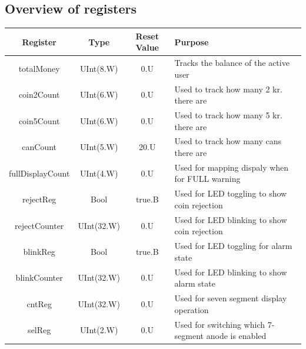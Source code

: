 \subsection{Overview of registers}
\renewcommand{\arraystretch}{1.3}
\begin{center}
    \begin{tabular}{ |c|c|c|p{7.5cm}| }
    \hline
        Register & Type & Reset Value & Purpose \\ 
        \hline \hline
        totalMoney & UInt(8.W) & 0.U & Tracks the balance of the active user \\ 
        \hline
        coin2Count & UInt(6.W) & 0.U & Used to track how many 2 kr. there are \\ 
        \hline
        coin5Count & UInt(6.W) & 0.U & Used to track how many 5 kr. there are \\ 
        \hline
        canCount & UInt(5.W) & 20.U & Used to track how many cans there are \\
        \hline
        fullDisplayCount & UInt(4.W) & 0.U & Used for mapping dispaly when for FULL warning \\
        \hline
        rejectReg & Bool & true.B & Used for LED toggling to show coin rejection \\
        \hline
        rejectCounter & UInt(32.W) & 0.U & Used for LED blinking to show coin rejection \\
        \hline
        blinkReg & Bool & true.B & Used for LED toggling for alarm state \\
        \hline
        blinkCounter & UInt(32.W) & 0.U & Used for LED blinking to show alarm state \\
        \hline
        cntReg & UInt(32.W) & 0.U & Used for seven segment display operation \\
        \hline
        selReg & UInt(2.W) & 0.U & Used for switching which 7-segment anode is enabled \\
    \hline
    \end{tabular}
\end{center}

